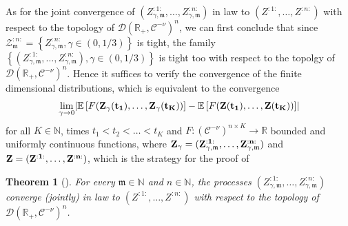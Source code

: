 \documentclass{report}
\newcommand{\NN}{\mathbb{N}}
\newcommand{\RR}{\mathbb{R}}
\DeclarePairedDelimiter\abs{\lvert}{\rvert} %
\newcommand{\Exp}[1]{\mathbb{E}\left[#1\right]}
\newtheorem{theorem}{Theorem}[chapter]
\theoremstyle{remark}
\theoremstyle{definition}
\begin{document}
As for the joint convergence of $(Z_{\gamma, \mathfrak{m}}^{:1:}, \ldots, Z_{\gamma, \mathfrak{m}}^{:n:})$ in law to $(Z^{:1:}, \ldots, Z^{:n:})$ with respect to the topology of $\mathcal{D}(\mathbb{R}_+, \mathcal{C}^{-\nu})^n$, we can first conclude that since $\mathcal{Z}^{:n:}_\mathfrak{m} = \left\{Z_{\gamma, \mathfrak{m}}^{:n:}, \gamma \in (0, 1/3)\right\}$ is tight, the family $\left\{(Z_{\gamma, \mathfrak{m}}^{:1:}, \ldots, Z_{\gamma, \mathfrak{m}}^{:n:}), \gamma \in (0, 1/3)\right\}$ is tight too with respect to the topolgy of $\mathcal{D}(\mathbb{R}_+, \mathcal{C}^{-\nu})^n$. Hence it suffices to verify the convergence of the finite dimensional distributions, which is equivalent to the convergence 
\begin{align*}
  \lim_{\gamma \to 0}\abs{\Exp{F(\bf{Z_\gamma(t_1), \ldots, Z_\gamma(t_K)})} - \Exp{F(\bf{Z(t_1), \ldots, Z(t_K)})}}
\end{align*}
for all $K \in \NN$, times $t_1 < t_2 < \ldots < t_K$ and $F: (\mathcal{C}^{-\nu})^{n \times K} \to \mathbb{R}$ bounded and uniformly continuous functions, where $\bf{Z}_\gamma = (Z^{:1:}_{\gamma, \mathfrak{m}}, \ldots, Z^{:n:}_{\gamma, \mathfrak{m}} )$ and $\bf{Z} = (Z^{:1:}, \ldots, Z^{:n:} )$, which is the strategy for the proof of 
\begin{theorem}[{\cite[Theorem 6.2]{mourrat2015convergencetwodimensionaldynamicisingkac}}]
  For every $\mathfrak{m} \in \NN$ and $n \in \NN$, the processes $(Z^{:1:}_{\gamma, \mathfrak{m}}, \ldots, Z^{:n:}_{\gamma, \mathfrak{m}} )$ converge (jointly) in law to $(Z^{:1:}, \ldots, Z^{:n:} )$ with respect to the topology of $\mathcal{D}(\RR_+, \mathcal{C}^{-\nu})^n$.
\end{theorem}
\end{document}

